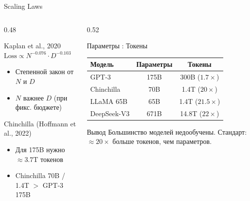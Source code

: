 \documentclass[aspectratio=169, 8pt]{beamer}
\begin{document}
\begin{frame}{Scaling Laws}
  \begin{columns}[T]
    \begin{column}{0.48\textwidth}
      \begin{block}{Kaplan et al., 2020}
        $\text{Loss} \propto N^{-0.076} \cdot D^{-0.103}$
        \begin{itemize}
          \item Степенной закон от $N$ и $D$
          \item $N$ важнее $D$ (при фикс. бюджете)
        \end{itemize}
      \end{block}
      \begin{block}{Chinchilla (Hoffmann et al., 2022)}
        \begin{itemize}
          \item Для 175B нужно $\approx 3.7$T токенов
          \item Chinchilla 70B / 1.4T $>$ GPT-3 175B
        \end{itemize}
      \end{block}
    \end{column}
    \begin{column}{0.52\textwidth}
      \begin{block}{Параметры : Токены}
        \begin{tabular}{lcc}
          \toprule
          \textbf{Модель} & \textbf{Параметры} & \textbf{Токены} \\
          \midrule
          GPT-3 & 175B & 300B ($1.7\times$) \\
          Chinchilla & 70B & 1.4T ($20\times$) \\
          LLaMA 65B & 65B & 1.4T ($21.5\times$) \\
          DeepSeek-V3 & 671B & 14.8T ($22\times$) \\
          \bottomrule
        \end{tabular}
      \end{block}
      \vspace{0.2em}
      \begin{alertblock}{Вывод}
        Большинство моделей недообучены. Стандарт: $\approx 20\times$ больше токенов, чем параметров.
      \end{alertblock}
    \end{column}
  \end{columns}
\end{frame}
\end{document}
